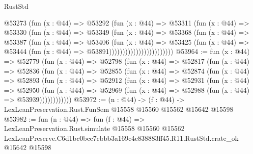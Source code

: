 \begin{lexlean}{RustStd}
\begin{coremodule}
                              @53273
                                (fun (x : @44) =>
                                @53292
                                  (fun (x : @44) =>
                                  @53311
                                    (fun (x : @44) =>
                                    @53330
                                      (fun (x : @44) =>
                                      @53349
                                        (fun (x : @44) =>
                                        @53368
                                          (fun (x : @44) =>
                                          @53387
                                            (fun (x : @44) =>
                                            @53406
                                              (fun (x : @44) =>
                                              @53425
                                                (fun (x : @44) =>
                                                @53444
                                                  (fun (x : @44) => @53891))))))))))))))))))))))))
@53964 := fun (x : @44) =>
  @52779
    (fun (x : @44) =>
    @52798
      (fun (x : @44) =>
      @52817
        (fun (x : @44) =>
        @52836
          (fun (x : @44) =>
          @52855
            (fun (x : @44) =>
            @52874
              (fun (x : @44) =>
              @52893
                (fun (x : @44) =>
                @52912
                  (fun (x : @44) =>
                  @52931
                    (fun (x : @44) =>
                    @52950
                      (fun (x : @44) =>
                      @52969 (fun (x : @44) => @52988 (fun (x : @44) => @53939))))))))))))
@53972 := (n : @44) ->
  (f : @44) -> LexLeanPreservation.Rust.FunSem @15558 @15560 @15562 @15642 @15598
@53982 := fun (n : @44) =>
  fun (f : @44) =>
  LexLeanPreservation.Rust.simulate
    @15558
    @15560
    @15562
    LexLeanPreserve.C6d1bc0bcc7cbbb3a169c4e838883ff45.R11.RustStd.crate_ok
    @15642
    @15598
\end{coremodule}
\end{lexlean}
